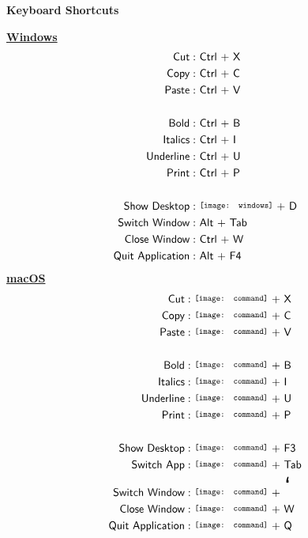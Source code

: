 \documentclass[12pt]{article}
\def\windows{\scalerel*{\texttt{[image: windows]}}{X}}
\def\cmdkey{\scalerel*{\texttt{[image: command]}}{X}}
\begin{document}
\centering\Huge\textbf{Keyboard Shortcuts}



\begin{multicols*}{2}
\centering\LARGE\underline{\textbf{Windows}}
\begin{align*}
\textsf{Cut} :\ &\textsf{Ctrl + X} \\
\textsf{Copy} :\ &\textsf{Ctrl + C} \\
\textsf{Paste} :\ &\textsf{Ctrl + V} \\
\\
\textsf{Bold} :\ &\textsf{Ctrl + B} \\
\textsf{Italics} :\ &\textsf{Ctrl + I} \\
\textsf{Underline} :\ &\textsf{Ctrl + U}\\
\textsf{Print} :\ &\textsf{Ctrl\ + P}\\
\\
\textsf{Show Desktop} :\ &\textsf{\windows\ + D} \\
\textsf{Switch Window} :\ &\textsf{Alt + Tab} \\
\textsf{Close Window} :\ &\textsf{Ctrl + W} \\
\textsf{Quit Application} :\ &\textsf{Alt + F4} \\
\end{align*}
\newline
\vfill\null
\columnbreak
\LARGE\underline{\textbf{macOS}}
\begin{align*}
\textsf{Cut} :\ &\textsf{\cmdkey\ + X} \\
\textsf{Copy} :\ &\textsf{\cmdkey\ + C} \\
\textsf{Paste} :\ &\textsf{\cmdkey\ + V} \\
\\
\textsf{Bold} :\ &\textsf{\cmdkey\ + B} \\
\textsf{Italics} :\ &\textsf{\cmdkey\ + I} \\
\textsf{Underline} :\ &\textsf{\cmdkey\ + U}\\
\textsf{Print} :\ &\textsf{\cmdkey\ + P}\\
\\
\textsf{Show Desktop} :\ &\textsf{\cmdkey\ + F3} \\
\textsf{Switch App} :\ &\textsf{\cmdkey\ + Tab} \\
\textsf{Switch Window} :\ &\textsf{\cmdkey\ + \Huge`} \\
\textsf{Close Window} :\ &\textsf{\cmdkey\ + W} \\
\textsf{Quit Application} :\ &\textsf{\cmdkey\ + Q} \\
\end{align*}
\end{multicols*}
\end{document}
